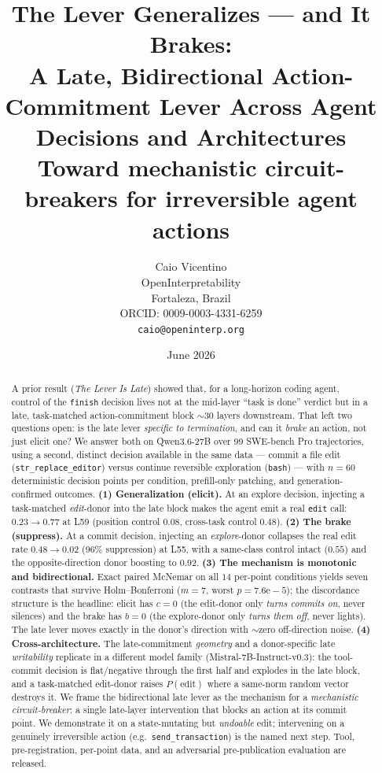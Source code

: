 \documentclass[11pt]{article}
\title{The Lever Generalizes --- and It Brakes: \\
A Late, Bidirectional Action-Commitment Lever Across Agent Decisions and Architectures \\[2pt]
\large Toward mechanistic circuit-breakers for irreversible agent actions}
\author{%
  Caio Vicentino \\
  OpenInterpretability \\
  Fortaleza, Brazil \\
  ORCID: 0009-0003-4331-6259 \\
  \texttt{caio@openinterp.org}%
}
\date{June 2026}
\begin{document}
\maketitle

\begin{abstract}
A prior result (\emph{The Lever Is Late}) showed that, for a long-horizon coding agent, control of the
\texttt{finish} decision lives not at the mid-layer ``task is done'' verdict but in a late, task-matched
action-commitment block $\sim$30 layers downstream. That left two questions open: is the late lever
\emph{specific to termination}, and can it \emph{brake} an action, not just elicit one? We answer both on
Qwen3.6-27B over 99 SWE-bench Pro trajectories, using a second, distinct decision available in the same data
--- commit a file edit (\texttt{str\_replace\_editor}) versus continue reversible exploration (\texttt{bash})
--- with $n{=}60$ deterministic decision points per condition, prefill-only patching, and generation-confirmed
outcomes. \textbf{(1) Generalization (elicit).} At an explore decision, injecting a task-matched
\emph{edit}-donor into the late block makes the agent emit a real \texttt{edit} call: $0.23 \to 0.77$ at L59
(position control $0.08$, cross-task control $0.48$). \textbf{(2) The brake (suppress).} At a commit decision,
injecting an \emph{explore}-donor collapses the real edit rate $0.48 \to 0.02$ (96\% suppression) at L55, with
a same-class control intact ($0.55$) and the opposite-direction donor boosting to $0.92$. \textbf{(3) The
mechanism is monotonic and bidirectional.} Exact paired McNemar on all $14$ per-point conditions yields seven
contrasts that survive Holm--Bonferroni ($m{=}7$, worst $p{=}7.6\mathrm{e}{-}5$); the discordance structure is
the headline: elicit has $c{=}0$ (the edit-donor only \emph{turns commits on}, never silences) and the brake
has $b{=}0$ (the explore-donor only \emph{turns them off}, never lights). The late lever moves exactly in the
donor's direction with $\sim$zero off-direction noise. \textbf{(4) Cross-architecture.} The late-commitment
\emph{geometry} and a donor-specific late \emph{writability} replicate in a different model family
(Mistral-7B-Instruct-v0.3): the tool-commit decision is flat/negative through the first half and explodes in
the late block, and a task-matched edit-donor raises $P(\text{edit})$ where a same-norm random vector destroys
it. We frame the bidirectional late lever as the mechanism for a \emph{mechanistic circuit-breaker}: a single
late-layer intervention that blocks an action at its commit point. We demonstrate it on a state-mutating but
\emph{undoable} edit; intervening on a genuinely irreversible action (e.g.\ \texttt{send\_transaction}) is the
named next step. Tool, pre-registration, per-point data, and an adversarial pre-publication evaluation are
released.
\end{abstract}
\end{document}
